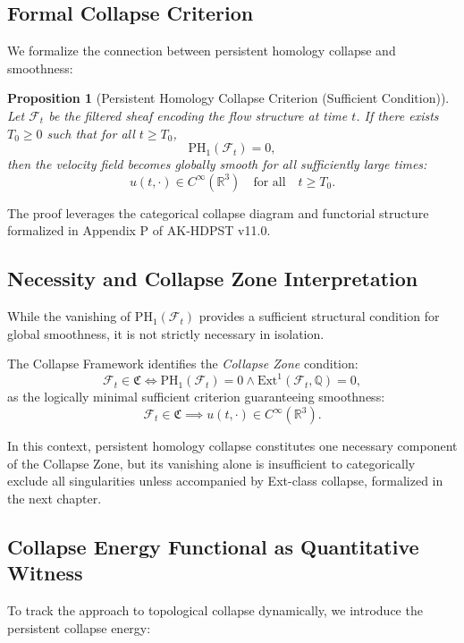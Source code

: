 \documentclass[11pt]{article}
\newtheorem{proposition}[theorem]{Proposition}
\begin{document}
\subsection{Formal Collapse Criterion}

We formalize the connection between persistent homology collapse and smoothness:

\begin{proposition}[Persistent Homology Collapse Criterion (Sufficient Condition)]
Let \( \mathcal{F}_t \) be the filtered sheaf encoding the flow structure at time \( t \). If there exists \( T_0 \geq 0 \) such that for all \( t \geq T_0 \),
\[
\mathrm{PH}_1(\mathcal{F}_t) = 0,
\]
then the velocity field becomes globally smooth for all sufficiently large times:
\[
u(t, \cdot) \in C^\infty(\mathbb{R}^3) \quad \text{for all} \quad t \geq T_0.
\]
\end{proposition}

The proof leverages the categorical collapse diagram and functorial structure formalized in Appendix P of AK-HDPST v11.0.

\subsection{Necessity and Collapse Zone Interpretation}

While the vanishing of \( \mathrm{PH}_1(\mathcal{F}_t) \) provides a sufficient structural condition for global smoothness, it is not strictly necessary in isolation.

The Collapse Framework identifies the \textit{Collapse Zone} condition:
\[
\mathcal{F}_t \in \mathfrak{C} \iff \mathrm{PH}_1(\mathcal{F}_t) = 0 \land \mathrm{Ext}^1(\mathcal{F}_t, \mathbb{Q}) = 0,
\]
as the logically minimal sufficient criterion guaranteeing smoothness:
\[
\mathcal{F}_t \in \mathfrak{C} \implies u(t, \cdot) \in C^\infty(\mathbb{R}^3).
\]

In this context, persistent homology collapse constitutes one necessary component of the Collapse Zone, but its vanishing alone is insufficient to categorically exclude all singularities unless accompanied by Ext-class collapse, formalized in the next chapter.

\subsection{Collapse Energy Functional as Quantitative Witness}

To track the approach to topological collapse dynamically, we introduce the persistent collapse energy:
\end{document}
